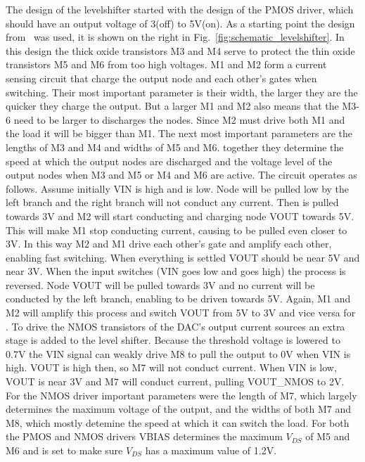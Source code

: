 The design of the levelshifter started with the design of the PMOS driver, which should have an output voltage of 3(off) to 5V(on). As a starting point the design from~\cite{powerdac} was used, it is shown on the right in Fig.~\ref{fig:schematic_levelshifter}. In this design the thick oxide transistors M3 and M4 serve to protect the thin oxide transistors M5 and M6 from too high voltages. M1 and M2 form a current sensing circuit that charge the output node and each other's gates when switching. Their most important parameter is their width, the larger they are the quicker they charge the output. But a larger M1 and M2 also means that the M3-6 need to be larger to discharges the nodes. Since M2 must drive both M1 and the load it will be bigger than M1. The next most important parameters are the lengths of M3 and M4 and widths of M5 and M6. together they determine the speed at which the output nodes are discharged and the voltage level of the output nodes when M3 and M5 or M4 and M6 are active. The circuit operates as follows. Assume initially VIN is high and  is low. Node  will be pulled low by the left branch and the right branch will not conduct any current. Then  is pulled towards 3V and M2 will start conducting and charging node VOUT towards 5V. This will make M1 stop conducting current, causing  to be pulled even closer to 3V. In this way M2 and M1 drive each other's gate and amplify each other, enabling fast switching. When everything is settled VOUT should be near 5V and  near 3V. When the input switches (VIN goes low and  goes high) the process is reversed. Node VOUT will be pulled towards 3V and no current will be conducted by the left branch, enabling  to be driven towards 5V. Again, M1 and M2 will amplify this process and switch VOUT from 5V to 3V and vice versa for .
To drive the NMOS transistors of the DAC's output current sources an extra stage is added to the level shifter. Because the threshold voltage is lowered to 0.7V the VIN signal can weakly drive M8 to pull the output to 0V when VIN is high. VOUT is high then, so M7 will not conduct current. When VIN is low, VOUT is near 3V and M7 will conduct current, pulling VOUT\_NMOS to 2V. For the NMOS driver important parameters were the length of M7, which largely determines the maximum voltage of the output, and the widths of both M7 and M8, which mostly detemine the speed at which it can switch the load. For both the PMOS and NMOS drivers VBIAS determines the maximum $V_{DS}$ of M5 and M6 and is set to make sure $V_{DS}$ has a maximum value of 1.2V.
